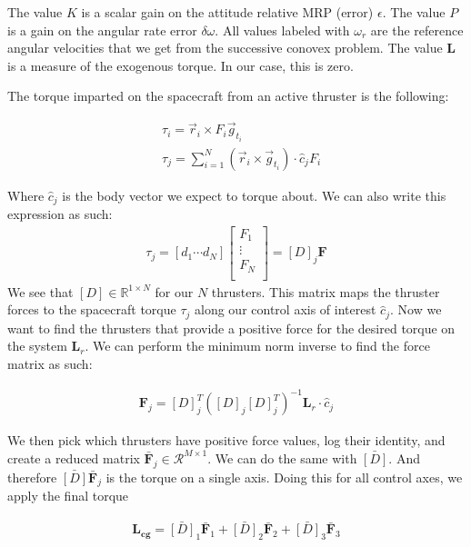 \documentclass[conf]{new-aiaa}
\begin{document}
\begin{singlespace}
The value $K$ is a scalar gain on the attitude relative MRP (error) $\epsilon$. The value $P$ is a gain on the angular rate error $\delta\omega$. All values labeled with $\omega_{r}$ are the reference angular velocities that we get from the successive conovex problem. The value $\mathbf{L}$ is a measure of the exogenous torque. In our case, this is zero.

The torque imparted on the spacecraft from an active thruster is the following:

\begin{align}
& \tau_i = \vec{r}_i \times F_i \vec{g}_{t_i} \\
& \tau_j = \sum _{i=1}^{N} (\vec{r}_i \times \vec{g}_{t_i}) \cdot \hat{c}_j F_i
\end{align}

Where $\hat{c}_j$ is the body vector we expect to torque about. We can also write this expression as such:
\begin{align}
\tau_j = \left[ d_1 \cdots d_N \right]
	\begin{bmatrix}
		F_1 \\
		\vdots \\
		F_N \\
 	\end{bmatrix}
= \left[D\right]_j\mathbf{F}
\end{align}
We see that $\left[D\right] \in \mathbb{R}^{1\times N}$ for our $N$ thrusters. This matrix maps the thruster forces to the spacecraft torque $\tau_j$ along our control axis of interest $\hat{c}_j$. Now we want to find the thrusters that provide a positive force for the desired torque on the system $\mathbf{L}_r$. We can perform the minimum norm  inverse to find the force matrix as such:

\begin{align}
\mathbf{F}_j = \left[D\right]_j^T (\left[D\right]_j \left[D\right]_j^T)^{-1}
\mathbf{L}_r \cdot \hat{c}_j
\end{align}

We then pick which thrusters have positive force values, log their identity, and create a reduced matrix $\bar{\mathbf{F}}_j \in \mathcal{R}^{M\times1}$. We can do the same with $\bar{\left[D\right]}$. And therefore $\bar{\left[D\right]}\bar{\mathbf{F}}_j$ is the torque on a single axis. Doing this for all control axes, we apply the final torque 

\begin{align}
\mathbf{L_{cg}} = \bar{\left[D\right]}_1\bar{\mathbf{F}}_1 + \bar{\left[D\right]}_2\bar{\mathbf{F}}_2 + \bar{\left[D\right]}_3\bar{\mathbf{F}}_3
\end{align}


\end{singlespace}
\end{document}
